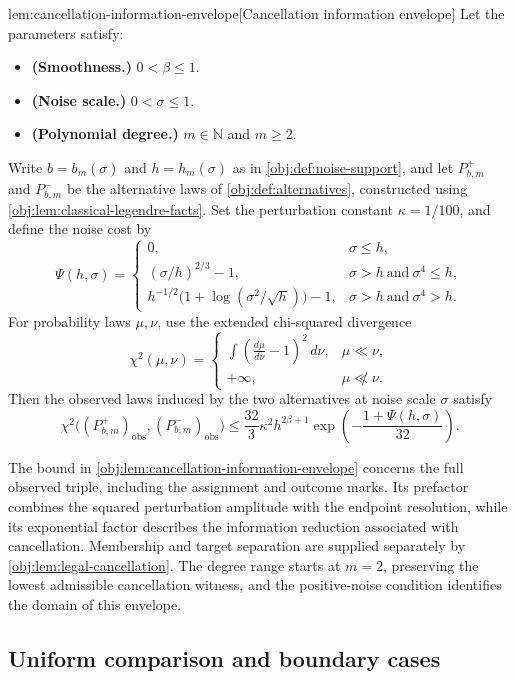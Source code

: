 \begin{lemmav}{lem:cancellation-information-envelope}[Cancellation information envelope]
Let the parameters satisfy:
\begin{itemize}
\item \textbf{(Smoothness.)} \(0<\beta\le1\).
\item \textbf{(Noise scale.)} \(0<\sigma\le1\).
\item \textbf{(Polynomial degree.)} \(m\in\mathbb N\) and \(m\ge2\).
\end{itemize}
Write \(b=b_m(\sigma)\) and \(h=h_m(\sigma)\) as in
\cref{obj:def:noise-support}, and let \(P^+_{b,m}\) and \(P^-_{b,m}\)
be the alternative laws of \cref{obj:def:alternatives}, constructed using
\cref{obj:lem:classical-legendre-facts}. Set the perturbation constant
\(\kappa=1/100\), and define the noise cost by
\[
\Psi(h,\sigma)=
\begin{cases}
0, & \sigma\le h,\\
(\sigma/h)^{2/3}-1, & \sigma>h\ \text{and}\ \sigma^4\le h,\\
h^{-1/2}\bigl(1+\log(\sigma^2/\sqrt h)\bigr)-1,
& \sigma>h\ \text{and}\ \sigma^4>h.
\end{cases}
\]
For probability laws \(\mu,\nu\), use the extended chi-squared divergence
\[
\chi^2(\mu,\nu)=
\begin{cases}
\displaystyle\int\left(\frac{d\mu}{d\nu}-1\right)^2\,d\nu,
& \mu\ll\nu,\\
+\infty, & \mu\not\ll\nu.
\end{cases}
\]
Then the observed laws induced by the two alternatives at noise scale
\(\sigma\) satisfy
\[
\chi^2\bigl((P^+_{b,m})_{\mathrm{obs}},
           (P^-_{b,m})_{\mathrm{obs}}\bigr)
\le
\frac{32}{3}\kappa^2 h^{2\beta+1}
\exp\!\left(-\frac{1+\Psi(h,\sigma)}{32}\right).
\]
\end{lemmav}

The bound in \cref{obj:lem:cancellation-information-envelope} concerns the full observed triple, including the assignment and outcome marks. Its prefactor combines the squared perturbation amplitude with the endpoint resolution, while its exponential factor describes the information reduction associated with cancellation. Membership and target separation are supplied separately by \cref{obj:lem:legal-cancellation}. The degree range starts at \(m=2\), preserving the lowest admissible cancellation witness, and the positive-noise condition identifies the domain of this envelope.

\subsection{Uniform comparison and boundary cases}

